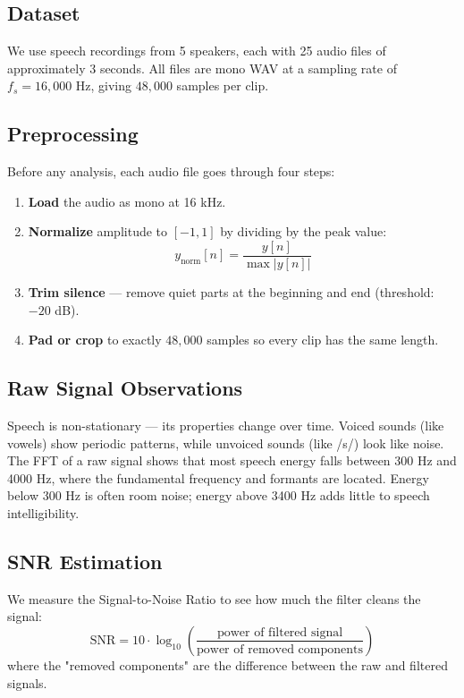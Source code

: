\subsection{Dataset}
We use speech recordings from 5 speakers, each with 25 audio files of approximately 3 seconds. All files are mono WAV at a sampling rate of $f_s = 16{,}000$ Hz, giving $48{,}000$ samples per clip.

\subsection{Preprocessing}
Before any analysis, each audio file goes through four steps:
\begin{enumerate}
  \item \textbf{Load} the audio as mono at 16 kHz.
  \item \textbf{Normalize} amplitude to $[-1, 1]$ by dividing by the peak value:
  $$y_{\text{norm}}[n] = \frac{y[n]}{\max |y[n]|}$$
  \item \textbf{Trim silence} — remove quiet parts at the beginning and end (threshold: $-20$ dB).
  \item \textbf{Pad or crop} to exactly $48{,}000$ samples so every clip has the same length.
\end{enumerate}

\subsection{Raw Signal Observations}
Speech is non-stationary — its properties change over time. Voiced sounds (like vowels) show periodic patterns, while unvoiced sounds (like /s/) look like noise. The FFT of a raw signal shows that most speech energy falls between 300 Hz and 4000 Hz, where the fundamental frequency and formants are located. Energy below 300 Hz is often room noise; energy above 3400 Hz adds little to speech intelligibility.

\subsection{SNR Estimation}
We measure the Signal-to-Noise Ratio to see how much the filter cleans the signal:
$$\text{SNR} = 10 \cdot \log_{10}\left(\frac{\text{power of filtered signal}}{\text{power of removed components}}\right)$$
where the "removed components" are the difference between the raw and filtered signals.
